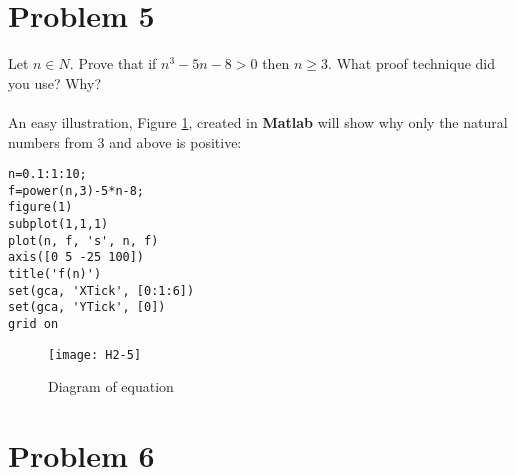 \documentclass[english,10pt,a4paper]{article}
\begin{document}
\section*{Problem 5}
Let $n \in N$. Prove that if $n^3 - 5n - 8 > 0$ then $n \geq 3$. What proof technique did you use? Why?
\\
\\
An easy illustration, Figure \ref{fig:prob5}, created in \textbf{Matlab} will show why only the natural numbers from 3 and above is positive:

\begin{lstlisting}[caption=title, style=Code-Matlab, label=lst:ref]
n=0.1:1:10;
f=power(n,3)-5*n-8;
figure(1)
subplot(1,1,1)
plot(n, f, 's', n, f)
axis([0 5 -25 100])
title('f(n)')
set(gca, 'XTick', [0:1:6])
set(gca, 'YTick', [0])
grid on
\end{lstlisting}
\begin{figure}[hbtp]
\centering
\texttt{[image: H2-5]}
\caption{Diagram of equation}
\label{fig:prob5}
\end{figure}


\section*{Problem 6}
\end{document}
